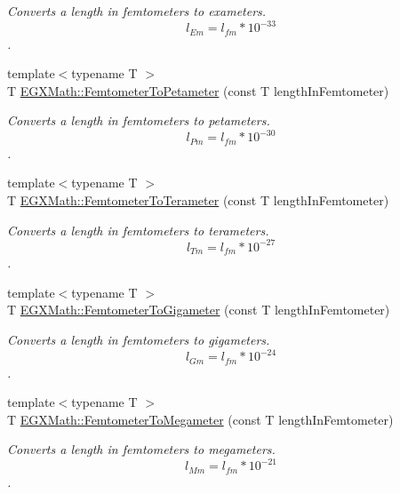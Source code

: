 \begin{DoxyCompactItemize}
\begin{DoxyCompactList}\small\item\em Converts a length in femtometers to exameters. \[ l_{Em}=l_{fm} * 10^{-33} \]. \end{DoxyCompactList}\item 
{\footnotesize template$<$typename T $>$ }\\T \mbox{\hyperlink{group___e_g_x_math-_conversions-_length_conversions-_s_i-_femtometer-_s_i_ga2145008022cfedfb81e40ceea426cda5}{E\+G\+X\+Math\+::\+Femtometer\+To\+Petameter}} (const T length\+In\+Femtometer)
\begin{DoxyCompactList}\small\item\em Converts a length in femtometers to petameters. \[ l_{Pm}=l_{fm} * 10^{-30} \]. \end{DoxyCompactList}\item 
{\footnotesize template$<$typename T $>$ }\\T \mbox{\hyperlink{group___e_g_x_math-_conversions-_length_conversions-_s_i-_femtometer-_s_i_ga9b76ed4edddb239375ea2ec8eb1cbc11}{E\+G\+X\+Math\+::\+Femtometer\+To\+Terameter}} (const T length\+In\+Femtometer)
\begin{DoxyCompactList}\small\item\em Converts a length in femtometers to terameters. \[ l_{Tm}=l_{fm} * 10^{-27} \]. \end{DoxyCompactList}\item 
{\footnotesize template$<$typename T $>$ }\\T \mbox{\hyperlink{group___e_g_x_math-_conversions-_length_conversions-_s_i-_femtometer-_s_i_gaccd849112d6d7fed98d4c4d737ec8872}{E\+G\+X\+Math\+::\+Femtometer\+To\+Gigameter}} (const T length\+In\+Femtometer)
\begin{DoxyCompactList}\small\item\em Converts a length in femtometers to gigameters. \[ l_{Gm}=l_{fm} * 10^{-24} \]. \end{DoxyCompactList}\item 
{\footnotesize template$<$typename T $>$ }\\T \mbox{\hyperlink{group___e_g_x_math-_conversions-_length_conversions-_s_i-_femtometer-_s_i_gac6c32f00b8dbf147521bdcfeb39b57f2}{E\+G\+X\+Math\+::\+Femtometer\+To\+Megameter}} (const T length\+In\+Femtometer)
\begin{DoxyCompactList}\small\item\em Converts a length in femtometers to megameters. \[ l_{Mm}=l_{fm} * 10^{-21} \]. \end{DoxyCompactList}\item 

\end{DoxyCompactItemize}
